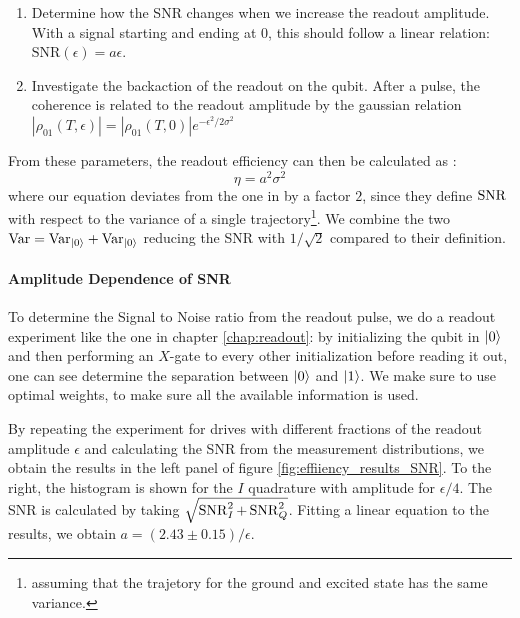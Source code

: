 \begin{enumerate}
    \item Determine how the SNR changes when we increase the readout amplitude. With a signal starting and ending at 0, this should follow a linear relation: $\text{SNR}(\epsilon) = a \epsilon$.
    \item Investigate the backaction of the readout on the qubit. After a pulse, the coherence is related to the readout amplitude by the gaussian relation $|\rho_{01}(T, \epsilon)| = |\rho_{01}(T, 0)|e^{-\epsilon^2/2\sigma^2}$
\end{enumerate}
From these parameters, the readout efficiency can then be calculated as \cite{bultink_general_2018}:
\begin{equation}
    \eta = a^2\sigma^2
\end{equation}
where our equation deviates from the one in \cite{bultink_general_2018} by a factor $2$, since they define $\operatorname{SNR}$ with respect to the variance of a single trajectory\footnote{assuming that the trajetory for the ground and excited state has the same variance.}. We combine the two $\text{Var} = \text{Var}_{\ket{0}} + \text{Var}_{\ket{0}}$ reducing the SNR with $1/\sqrt{2}$ compared to their definition.

\paragraph{Amplitude Dependence of SNR }
To determine the Signal to Noise ratio from the readout pulse, we do a readout experiment like the one in chapter \ref{chap:readout}: by initializing the qubit in $\ket{0}$ and then performing an $X$-gate to every other initialization before reading it out, one can see determine the separation between $\ket{0}$ and $\ket{1}$. We make sure to use optimal weights, to make sure all the available information is used.


By repeating the experiment for drives with different fractions of the readout amplitude $\epsilon$ and calculating the SNR from the measurement distributions, we obtain the results in the left panel of figure \ref{fig:effiiency_results_SNR}. To the right, the histogram is shown for the $I$ quadrature with amplitude for $\epsilon / 4$. The SNR is calculated by taking $\sqrt{\operatorname{SNR}_I^2 + \operatorname{SNR}_Q^2}$. Fitting a linear equation to the results, we obtain $a = (2.43 \pm 0.15) / \epsilon$. 

